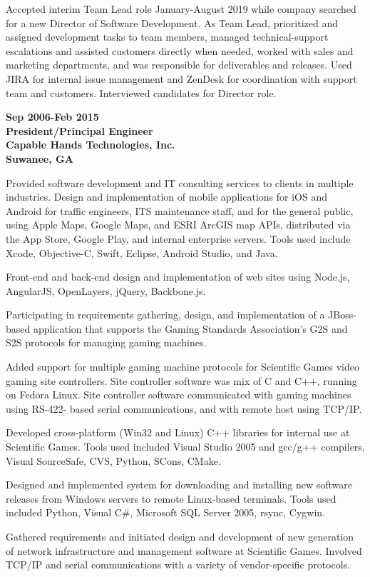 Accepted interim Team Lead role January-August 2019 while company
searched for a new Director of Software Development. As Team Lead,
prioritized and assigned development tasks to team members, managed
technical-support escalations and assisted customers directly when
needed, worked with sales and marketing departments, and was responsible
for deliverables and releases. Used JIRA for internal issue management
and ZenDesk for coordination with support team and customers.
Interviewed candidates for Director role.

\textbf{Sep 2006-Feb 2015\\
President/Principal Engineer\\
Capable Hands Technologies, Inc.\\
Suwanee, GA}

Provided software development and IT consulting services to clients in
multiple industries. Design and implementation of mobile applications
for iOS and Android for traffic engineers, ITS maintenance staff, and
for the general public, using Apple Maps, Google Maps, and ESRI ArcGIS
map APIs, distributed via the App Store, Google Play, and internal
enterprise servers. Tools used include Xcode, Objective-C, Swift,
Eclipse, Android Studio, and Java.

Front-end and back-end design and implementation of web sites using
Node.js, AngularJS, OpenLayers, jQuery, Backbone.js.

Participating in requirements gathering, design, and implementation of a
JBoss-based application that supports the Gaming Standards Association's
G2S and S2S protocols for managing gaming machines.

Added support for multiple gaming machine protocols for Scientific Games
video gaming site controllers. Site controller software was mix of C and
C++, running on Fedora Linux. Site controller software communicated with
gaming machines using RS-422- based serial communications, and with
remote host using TCP/IP.

Developed cross-platform (Win32 and Linux) C++ libraries for internal
use at Scientific Games. Tools used included Visual Studio 2005 and
gcc/g++ compilers, Visual SourceSafe, CVS, Python, SCons, CMake.

Designed and implemented system for downloading and installing new
software releases from Windows servers to remote Linux-based terminals.
Tools used included Python, Visual C\#, Microsoft SQL Server 2005,
rsync, Cygwin.

Gathered requirements and initiated design and development of new
generation of network infrastructure and management software at
Scientific Games. Involved TCP/IP and serial communications with a
variety of vendor-specific protocols.

